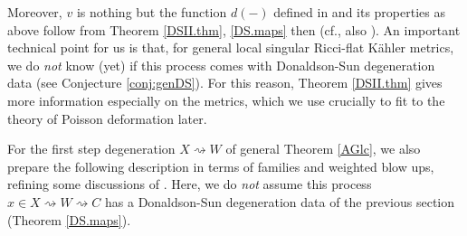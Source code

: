 \documentclass[12pt,a4paper]{amsart}
\theoremstyle{remark}
\theoremstyle{definition}
\begin{document}
Moreover, $v$ is nothing but 
the function $d(-)$ defined in \cite[(3.1)]{DSII} and 
its properties as above follow from Theorem \ref{DSII.thm}, 
\ref{DS.maps} then (cf., also \cite[Appendix C]{HS}). 
An important technical point for us is that, for general local  
singular 
Ricci-flat K\"ahler metrics, we do {\it not} 
know (yet) if this process comes with 
Donaldson-Sun degeneration data (see Conjecture \ref{conj:genDS}). 
For this reason, Theorem \ref{DSII.thm} gives more 
information especially on the metrics, 
which we use crucially to fit to the theory of Poisson deformation 
later. 

For the first step degeneration 
$X\rightsquigarrow W$ of general Theorem \ref{AGlc}, 
we also prepare the following description 
in terms of families and weighted blow ups, refining some discussions  
of \cite{LX, Od24b}. Here, we do {\it not} assume this process 
$x\in X\rightsquigarrow W\rightsquigarrow C$ has a 
Donaldson-Sun degeneration data of the previous section (Theorem \ref{DS.maps}). 
\end{document}
